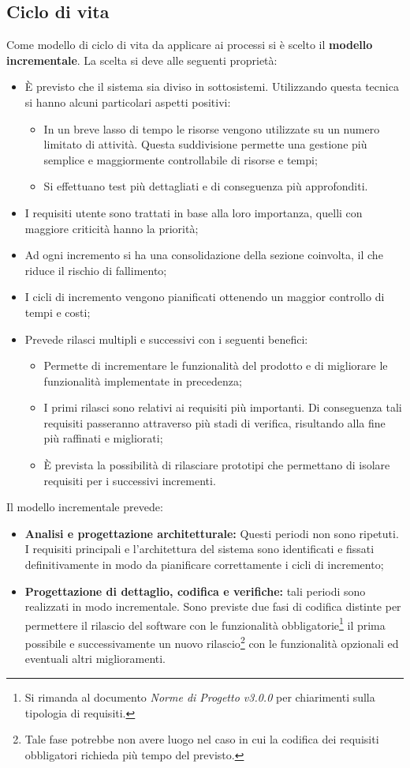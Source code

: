 \subsection{Ciclo di vita}
Come modello di ciclo di vita da applicare ai processi si è scelto il \textbf{modello incrementale}. La scelta si deve alle seguenti proprietà:
\begin{itemize}
	\item È previsto che il sistema sia diviso in sottosistemi. Utilizzando questa tecnica si hanno alcuni particolari aspetti positivi:
	\begin{itemize}
		\item In un breve lasso di tempo le risorse vengono utilizzate su un numero limitato di attività. Questa suddivisione permette una gestione più semplice e maggiormente controllabile di risorse e tempi;
		\item Si effettuano test più dettagliati e di conseguenza più approfonditi.
	\end{itemize}
	\item I requisiti utente sono trattati in base alla loro importanza, quelli con maggiore criticità hanno la priorità;
	\item Ad ogni incremento si ha una consolidazione della sezione coinvolta, il che riduce il rischio di fallimento;
	\item I cicli di incremento vengono pianificati ottenendo un maggior controllo di tempi e costi;
	\item Prevede rilasci multipli e successivi con i seguenti benefici:
	\begin{itemize}
		\item Permette di incrementare le funzionalità del prodotto e di migliorare le funzionalità implementate in precedenza;
		\item I primi rilasci sono relativi ai requisiti più importanti. Di conseguenza tali requisiti passeranno attraverso più stadi di verifica, risultando alla fine più raffinati e migliorati;
		\item È prevista la possibilità di rilasciare prototipi che permettano di isolare requisiti per i successivi incrementi.
	\end{itemize}
\end{itemize}
Il modello incrementale prevede:
\begin{itemize}
	\item \textbf{Analisi e progettazione architetturale:} Questi periodi non sono ripetuti. I requisiti principali e l'architettura del sistema sono identificati e fissati definitivamente in modo da pianificare correttamente i cicli di incremento; 
	\item \textbf{Progettazione di dettaglio, codifica e verifiche:} tali periodi sono realizzati in modo incrementale. Sono previste due fasi di codifica distinte per permettere il rilascio del software con le funzionalità obbligatorie\footnote{Si rimanda al documento \textit{Norme di Progetto v3.0.0} per chiarimenti sulla tipologia di requisiti.} il prima possibile e successivamente un nuovo rilascio\footnote{Tale fase potrebbe non avere luogo nel caso in cui la codifica dei requisiti obbligatori richieda più tempo del previsto.} con le funzionalità opzionali ed eventuali altri miglioramenti.
\end{itemize}
